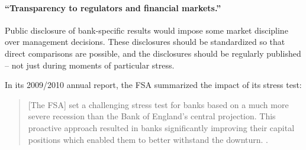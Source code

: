 \paragraph{``Transparency to regulators and financial markets.''} Public disclosure of bank-specific results would impose some market discipline over management decisions. These disclosures should be standardized so that direct comparisons are possible, and the disclosures should be regularly published -- not just during moments of particular stress.

In its 2009/2010 annual report, the FSA summarized the impact of its stress test:

\begin{quote}
[The FSA] set a challenging stress test for banks based on a much more severe recession than the Bank of England’s central projection. This proactive approach resulted in banks significantly improving their capital positions which enabled them to better withstand the downturn. \citep{FSAReport}.
\end{quote}
